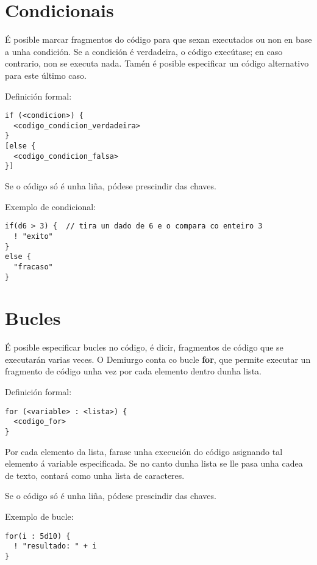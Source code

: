 \section{Condicionais}
É posible marcar fragmentos do código para que sexan executados ou non en base a
unha condición. Se a condición é verdadeira, o código execútase; en caso
contrario, non se executa nada. Tamén é posible especificar un código
alternativo para este último caso.
\par Definición formal:
\begin{lstlisting}
if (<condicion>) {
  <codigo_condicion_verdadeira>
}
[else {
  <codigo_condicion_falsa>
}]
\end{lstlisting}
\par Se o código só é unha liña, pódese prescindir das chaves.
\par Exemplo de condicional:
\begin{lstlisting}
if(d6 > 3) {  // tira un dado de 6 e o compara co enteiro 3
  ! "exito"
}
else {
  "fracaso"
}
\end{lstlisting}

\section{Bucles}
É posible especificar bucles no código, é dicir, fragmentos de código que se
executarán varias veces. O Demiurgo conta co bucle {\bf for}, que permite
executar un fragmento de código unha vez por cada elemento dentro dunha lista.
\par Definición formal:
\begin{lstlisting}
for (<variable> : <lista>) {
  <codigo_for>
}
\end{lstlisting}
\par Por cada elemento da lista, farase unha execución do código asignando tal
elemento á variable especificada. Se no canto dunha lista se lle pasa unha cadea
de texto, contará como unha lista de caracteres.
\par Se o código só é unha liña, pódese prescindir das chaves.
\par Exemplo de bucle:
\begin{lstlisting}
for(i : 5d10) {
  ! "resultado: " + i
}
\end{lstlisting}

